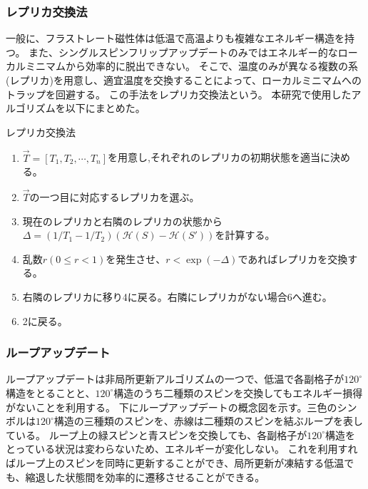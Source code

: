 \documentclass[12pt,titlepage,dvipdfmx]{jarticle}
\begin{document}
\subsubsection{レプリカ交換法}
一般に、フラストレート磁性体は低温で高温よりも複雑なエネルギー構造を持つ。
また、シングルスピンフリップアップデートのみではエネルギー的なローカルミニマムから効率的に脱出できない。
そこで、温度のみが異なる複数の系(レプリカ)を用意し、適宜温度を交換することによって、ローカルミニマムへのトラップを回避する。
この手法をレプリカ交換法\cite{Hukushima2013}という。
本研究で使用したアルゴリズムを以下にまとめた。
\begin{itembox}[2]{レプリカ交換法}
\begin{enumerate}
    \item $\vec{T}=[T_1,T_2,\cdots,T_n]$を用意し,それぞれのレプリカの初期状態を適当に決める。
    \item $\vec{T}$の一つ目に対応するレプリカを選ぶ。
    \item 現在のレプリカと右隣のレプリカの状態から$\Delta = (1/T_1 - 1/T_{2})\left(\mathcal{H}(S) - \mathcal{H}(S')\right)$を計算する。
    \item 乱数$r(0\le r<1)$を発生させ、$r<\exp(-\Delta)$であればレプリカを交換する。
    \item 右隣のレプリカに移り4に戻る。右隣にレプリカがない場合6へ進む。
    \item 2に戻る。
\end{enumerate}
\end{itembox}

\subsubsection{ループアップデート}
ループアップデートは非局所更新アルゴリズムの一つで、低温で各副格子が$120^\circ$構造をとることと、$120^\circ$構造のうち二種類のスピンを交換してもエネルギー損得がないことを利用する\cite{Schnabel2012}。
下にループアップデートの概念図を示す。三色のシンボルは$120^\circ$構造の三種類のスピンを、赤線は二種類のスピンを結ぶループを表している。
ループ上の緑スピンと青スピンを交換しても、各副格子が$120^\circ$構造をとっている状況は変わらないため、エネルギーが変化しない。
これを利用すればループ上のスピンを同時に更新することができ、局所更新が凍結する低温でも、縮退した状態間を効率的に遷移させることができる。
\end{document}
